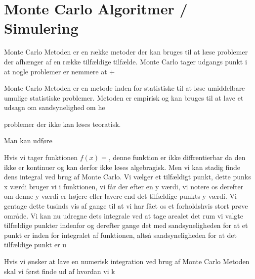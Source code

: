 \documentclass[../../SRP.tex]{subfiles}
\begin{document}
\chapter{Monte Carlo Algoritmer / Simulering}

Monte Carlo Metoden er en række metoder der kan bruges til at læse problemer der afhænger af en række tilfældige tilfælde. Monte Carlo tager udgangs punkt i at nogle problemer er nemmere at  +

Monte Carlo Metoden er en metode inden for statistiske til at løse umiddelbare umulige statistiske problemer. Metoden er empirisk og kan bruges til at lave et udsagn om sandsynelighed om he 

problemer der ikke kan løses teoratisk.

Man kan udføre


Hvis vi tager funktionen $f(x)=$, denne funktion er ikke diffrentierbar da den ikke er kontinuer og kan derfor ikke løses algebragisk. Men vi kan stadig finde dens integral ved brug af Monte Carlo. Vi vælger et tilfældigt punkt, dette punks x værdi bruger vi i funktionen, vi får der efter en y værdi, vi notere os derefter om denne y værdi er højere eller lavere end det tilfældige punkts y værdi. Vi gentage dette tusinds vis af gange til at vi har fået os et forholdshvis stort prøve område. Vi kan nu udregne dets integrale ved at tage arealet det rum vi valgte tilfældige punkter indenfor og derefter gange det med sandsyneligheden for at et punkt er inden for integralet af funktionen, altså sandsyneligheden for at det tilfældige punkt er u

Hvis vi ønsker at lave en numerisk integration ved brug af Monte Carlo Metoden skal vi først finde ud af hvordan vi k
\end{document}
